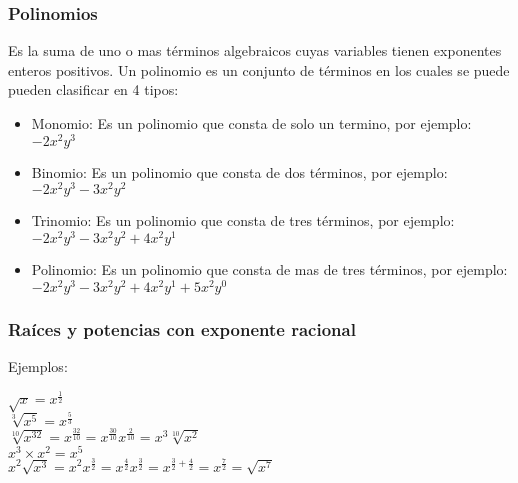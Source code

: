 \subsubsection{Polinomios}
Es la suma de uno o mas términos algebraicos cuyas variables tienen exponentes enteros positivos.
Un polinomio es un conjunto de términos en los cuales se puede pueden clasificar en 4 tipos:

\begin{itemize}
	\item Monomio: Es un polinomio que consta de solo un termino, por ejemplo: $-2x^2y^3$
	\item Binomio: Es un polinomio que consta de dos términos, por ejemplo: $-2x^2y^3 - 3x^2y^2$
	\item Trinomio: Es un polinomio que consta de tres términos, por ejemplo: $-2x^2y^3 - 3x^2y^2 + 4x^2y^1$
	\item Polinomio: Es un polinomio que consta de mas de tres términos, por ejemplo: $-2x^2y^3 - 3x^2y^2 + 4x^2y^1 + 5x^2y^0$
\end{itemize}

\subsubsection{Raíces y potencias con exponente racional}
Ejemplos:

\begin{center}
$\sqrt{x} = x^{\frac{1}{2}}$\\

$\sqrt[3]{x^5} = x^{\frac{5}{3}}$\\

$\sqrt[10]{x^{32}} = x^\frac{32}{10} = x^\frac{30}{10}x^\frac{2}{10} = x^3\sqrt[10]{x^2}$\\

$x^3 \times x^2 = x^5$\\

$x^2\sqrt{x^3} = x^2x^\frac{3}{2} = x^\frac{4}{2}x^\frac{3}{2} = x^{\frac{3}{2} + \frac{4}{2}} = x^\frac{7}{2} = \sqrt{x^7}$	
\end{center}
